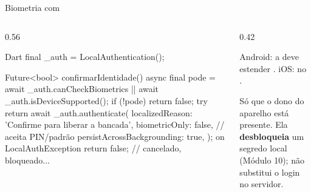 \documentclass[aspectratio=169,10pt]{beamer}
\begin{document}
\begin{frame}[fragile]{Biometria com }
  \begin{columns}[T]
    \begin{column}{0.56\textwidth}
\begin{codigo}[title=Confirmar uma ação sensível (local\_auth 3)]{Dart}
final _auth = LocalAuthentication();

Future<bool> confirmarIdentidade() async {
  final pode = await _auth.canCheckBiometrics ||
      await _auth.isDeviceSupported();
  if (!pode) return false;
  try {
    return await _auth.authenticate(
      localizedReason: 'Confirme para liberar a bancada',
      biometricOnly: false,       // aceita PIN/padrão
      persistAcrossBackgrounding: true,
    );
  } on LocalAuthException {
    return false;                 // cancelado, bloqueado...
  }
}
\end{codigo}
    \end{column}
    \begin{column}{0.42\textwidth}
      \begin{atencao}[Configuração]
        Android: a  deve estender . iOS:  no .
      \end{atencao}
      \begin{conceito}
        Só que o dono do aparelho está presente. Ela \textbf{desbloqueia} um segredo local (Módulo 10); não substitui o login no servidor.
      \end{conceito}
    \end{column}
  \end{columns}
\end{frame}
\end{document}
